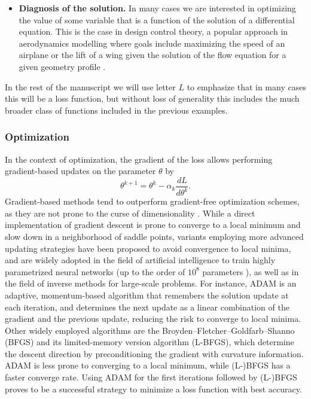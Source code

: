 \begin{itemize}
    \item \textbf{Diagnosis of the solution.} In many cases we are interested in optimizing the value of some variable that is a function of the solution of a differential equation. This is the case in design control theory, a popular approach in aerodynamics modelling where goals include maximizing the speed of an airplane or the lift of a wing given the solution of the flow equation for a given geometry profile \cite{Jameson_1988,Giles:2000wp,Mohammadi:2004dg}. 
\end{itemize}
In the rest of the manuscript we will use letter $L$ to emphasize that in many cases this will be a loss function, but without loss of generality this includes the much broader class of functions included in the previous examples. 

\subsubsection{Optimization}

In the context of optimization, the gradient of the loss allows performing gradient-based updates on the parameter $\theta$ by 
\begin{equation}
    \theta^{k+1} 
    = 
    \theta^k 
    - 
    \alpha_k 
    \frac{dL}{d\theta^k}.
\end{equation}
Gradient-based methods tend to outperform gradient-free optimization schemes, as they are not prone to the curse of dimensionality \cite{Schartau2017}. 
While a direct implementation of gradient descent is prone to converge to a local minimum and slow down in a neighborhood of saddle points, variants employing more advanced updating strategies have been proposed \cite{ruder2016overview-gradient-descent} to avoid convergence to local minima, and are widely adopted in the field of artificial intelligence to train highly parametrized neural networks (up to the order of $10^8$ parameters \cite{NIPS2017_3f5ee243}), as well as in the field of inverse methods for large-scale problems. 
For instance, ADAM \cite{Kingma2014} is an adaptive, momentum-based algorithm  that remembers the solution update at each iteration, and determines the next update as a linear combination of the gradient and the previous update, reducing the risk to converge to local minima. 
Other widely employed algorithms are the Broyden–Fletcher–Goldfarb–Shanno (BFGS) and its limited-memory version algorithm (L-BFGS), which determine the descent direction by preconditioning the gradient with curvature information. 
ADAM is less prone to converging to a local minimum, while (L-)BFGS has a faster converge rate. 
Using ADAM for the first iterations followed by (L-)BFGS proves to be a successful strategy to minimize a loss function with best accuracy. 

